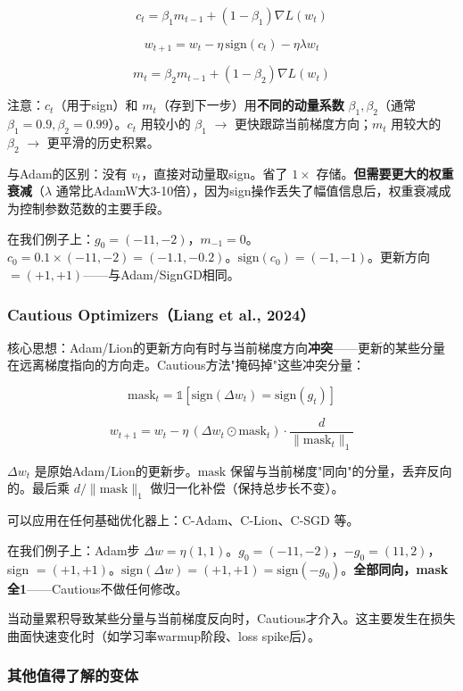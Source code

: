 \documentclass[12pt,a4paper]{article}
\begin{document}
\[c_t = \beta_1 m_{t-1} + (1-\beta_1)\nabla L(w_t)\]

\[w_{t+1} = w_t - \eta\,\text{sign}(c_t) - \eta\lambda w_t\]

\[m_t = \beta_2 m_{t-1} + (1-\beta_2)\nabla L(w_t)\]

注意：$c_t$（用于sign）和 $m_t$（存到下一步）用\textbf{不同的动量系数} $\beta_1, \beta_2$（通常 $\beta_1 = 0.9, \beta_2 = 0.99$）。$c_t$ 用较小的 $\beta_1$ $\to$ 更快跟踪当前梯度方向；$m_t$ 用较大的 $\beta_2$ $\to$ 更平滑的历史积累。

与Adam的区别：没有 $v_t$，直接对动量取sign。省了 $1\times$ 存储。\textbf{但需要更大的权重衰减}（$\lambda$ 通常比AdamW大3-10倍），因为sign操作丢失了幅值信息后，权重衰减成为控制参数范数的主要手段。

在我们例子上：$g_0 = (-11, -2)$，$m_{-1} = 0$。$c_0 = 0.1 \times (-11,-2) = (-1.1, -0.2)$。$\text{sign}(c_0) = (-1, -1)$。更新方向 $= (+1, +1)$——与Adam/SignGD相同。


\subsubsection{Cautious Optimizers（Liang et al., 2024）}

核心思想：Adam/Lion的更新方向有时与当前梯度方向\textbf{冲突}——更新的某些分量在远离梯度指向的方向走。Cautious方法"掩码掉"这些冲突分量：


\[\text{mask}_t = \mathbb{1}[\text{sign}(\Delta w_t) = \text{sign}(g_t)]\]

\[w_{t+1} = w_t - \eta\,(\Delta w_t \odot \text{mask}_t) \cdot \frac{d}{\|\text{mask}_t\|_1}\]

$\Delta w_t$ 是原始Adam/Lion的更新步。$\text{mask}$ 保留与当前梯度"同向"的分量，丢弃反向的。最后乘 $d/\|\text{mask}\|_1$ 做归一化补偿（保持总步长不变）。

可以应用在任何基础优化器上：C-Adam、C-Lion、C-SGD 等。

在我们例子上：Adam步 $\Delta w = \eta(1, 1)$。$g_0 = (-11, -2)$，$-g_0 = (11, 2)$，sign $= (+1, +1)$。$\text{sign}(\Delta w) = (+1, +1) = \text{sign}(-g_0)$。\textbf{全部同向，mask全1}——Cautious不做任何修改。

当动量累积导致某些分量与当前梯度反向时，Cautious才介入。这主要发生在损失曲面快速变化时（如学习率warmup阶段、loss spike后）。


\subsubsection{其他值得了解的变体}
\end{document}
